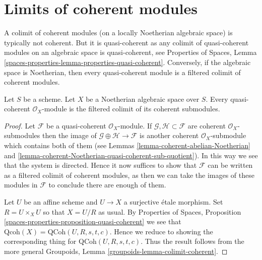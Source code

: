 \section{Limits of coherent modules}
\label{section-limits}

\noindent
A colimit of coherent modules (on a locally Noetherian
algebraic space) is typically not coherent. But it is quasi-coherent
as any colimit of quasi-coherent modules on an algebraic space is
quasi-coherent, see Properties of Spaces, Lemma
\ref{spaces-properties-lemma-properties-quasi-coherent}.
Conversely, if the algebraic space is Noetherian, then every quasi-coherent
module is a filtered colimit of coherent modules.

\begin{lemma}
\label{lemma-directed-colimit-coherent}
Let $S$ be a scheme. Let $X$ be a Noetherian algebraic space over $S$.
Every quasi-coherent $\mathcal{O}_X$-module is the filtered colimit
of its coherent submodules.
\end{lemma}

\begin{proof}
Let $\mathcal{F}$ be a quasi-coherent $\mathcal{O}_X$-module.
If $\mathcal{G}, \mathcal{H} \subset \mathcal{F}$ are coherent
$\mathcal{O}_X$-submodules then the image of
$\mathcal{G} \oplus \mathcal{H} \to \mathcal{F}$ is another
coherent $\mathcal{O}_X$-submodule which contains both of them
(see Lemmas \ref{lemma-coherent-abelian-Noetherian} and
\ref{lemma-coherent-Noetherian-quasi-coherent-sub-quotient}).
In this way we see that the system is directed.
Hence it now suffices to show that $\mathcal{F}$ can be written as
a filtered colimit of coherent modules, as then we can take the
images of these modules in $\mathcal{F}$ to conclude there are
enough of them.

\medskip\noindent
Let $U$ be an affine scheme and $U \to X$ a surjective \'etale morphism.
Set $R = U \times_X U$ so that $X = U/R$ as usual. By
Properties of Spaces, Proposition
\ref{spaces-properties-proposition-quasi-coherent}
we see that $\text{Qcoh}(X) = \text{QCoh}(U, R, s, t, c)$. Hence
we reduce to showing the corresponding thing for
$\text{QCoh}(U, R, s, t, c)$. Thus the result follows from
the more general Groupoids, Lemma \ref{groupoids-lemma-colimit-coherent}.
\end{proof}










